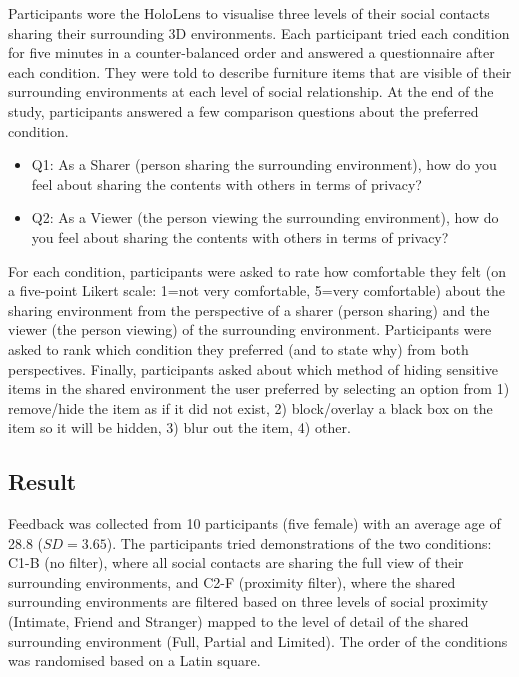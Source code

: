 Participants wore the HoloLens to visualise three levels of their social contacts sharing their surrounding 3D environments. Each participant tried each condition for five minutes in a counter-balanced order and answered a questionnaire after each condition. They were told to describe furniture items that are visible of their surrounding environments at each level of social relationship. At the end of the study, participants answered a few comparison questions about the preferred condition. 

\begin{itemize}
    \item Q1: As a Sharer (person sharing the surrounding environment), how do you feel about sharing the contents with others in terms of privacy? 
    \item Q2: As a Viewer (the person viewing the surrounding environment), how do you feel about sharing the contents with others in terms of privacy? 
\end{itemize}

For each condition, participants were asked to rate how comfortable they felt (on a five-point Likert scale: 1=not very comfortable, 5=very comfortable) about the sharing environment from the perspective of a sharer (person sharing) and the viewer (the person viewing) of the surrounding environment. Participants were asked to rank which condition they preferred (and to state why) from both perspectives. Finally, participants asked about which method of hiding sensitive items in the shared environment the user preferred by selecting an option from 1) remove/hide the item as if it did not exist, 2) block/overlay a black box on the item so it will be hidden, 3) blur out the item, 4) other. 

\subsection{Result}

Feedback was collected from 10 participants (five female) with an average age of 28.8 ($SD=3.65$). The participants tried demonstrations of the two conditions: C1-B (no filter), where all social contacts are sharing the full view of their surrounding environments, and C2-F (proximity filter), where the shared surrounding environments are filtered based on three levels of social proximity (Intimate, Friend and Stranger) mapped to the level of detail of the shared surrounding environment (Full, Partial and Limited). The order of the conditions was randomised based on a Latin square. 

